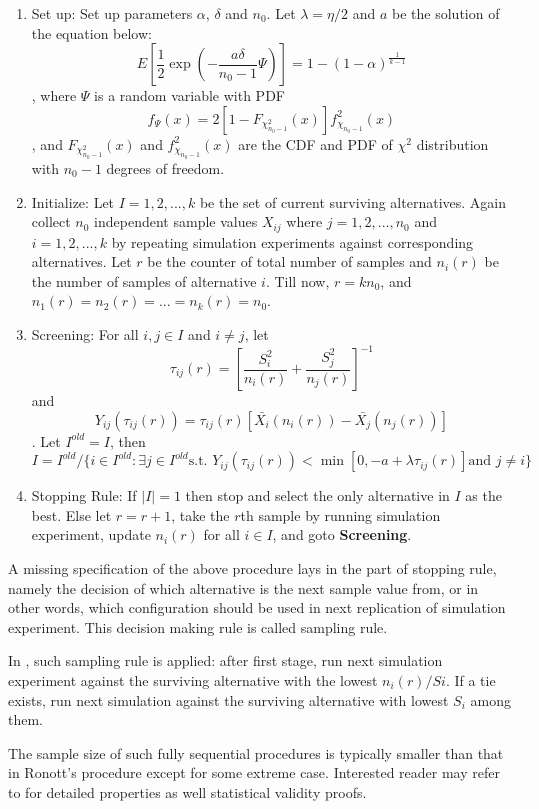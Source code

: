\documentclass[12pt,a4paper]{report}
\begin{document}
\begin{enumerate}
\item{Set up: } Set up parameters $\alpha$, $\delta$ and $n_0$. Let $\lambda = \eta / 2$ and $a$ be the solution of the equation below:
$$ E[\frac{1}{2}\exp(- \frac{a\delta}{n_0 - 1} \Psi)] = 1 - (1 - \alpha)^{\frac{1}{k - 1}} $$,
where $\Psi$ is a random variable with PDF
$$ f_{\Psi}(x) = 2 [1 - F_{\chi_{n_0 - 1}^2}(x)] f_{\chi_{n_0 - 1}}^2(x) $$,
and $F_{\chi_{n_0 - 1}^2}(x)$ and $f_{\chi_{n_0 - 1}}^2(x)$ are the CDF and PDF of $\chi^2$ distribution with $n_0 - 1$ degrees of freedom.
\item{Initialize: } Let $I = {1, 2,...,k}$ be the set of current surviving alternatives. Again collect $n_0$ independent sample values $X_{ij}$ where $j = 1, 2,...,n_0$ and $i = 1, 2,...,k$ by repeating simulation experiments against corresponding alternatives. Let $r$ be the counter of total number of samples and $n_i(r)$ be the number of samples of alternative $i$. Till now, $r = kn_0$, and $n_1(r) = n_2(r) = ... = n_k(r) = n_0$.
\item{Screening: } For all $i,j \in I$ and $i \neq j$, let 
$$ \tau_{ij}(r) = [\frac{S_i^2}{n_i(r)} + \frac{S_j^2}{n_j(r)}]^{-1} $$
and
$$ Y_{ij}(\tau_{ij}(r)) = \tau_{ij}(r)[\bar{X_i}(n_i(r)) - \bar{X_j}(n_j(r))] $$.
Let $I^{old} = I$, then
$$ I = I^{old}/\{i \in I^{old}: \exists j \in I^{old} \text{s.t. } Y_{ij}(\tau_{ij}(r)) < \min[0, - a + \lambda \tau_{ij}(r)]  \text{and } j \neq i\} $$
\item{Stopping Rule: } If $|I| = 1$ then stop and select the only alternative in $I$ as the best. Else let $r = r + 1$, take the $r$th sample by running simulation experiment, update $n_i(r)$ for all $i \in I$, and goto \textbf{Screening}.
\end{enumerate}

A missing specification of the above procedure lays in the part of stopping rule, namely the decision of which alternative is the next sample value from, or in other words, which configuration should be used in next replication of simulation experiment. This decision making rule is called sampling rule.

In \cite{ras-seq-jeff}, such sampling rule is applied: after first stage, run next simulation experiment against the surviving alternative with the lowest $n_i(r)/Si$. If a tie exists, run next simulation against the surviving alternative with lowest $S_i$ among them.

The sample size of such fully sequential procedures is typically smaller than that in Ronott's procedure except for some extreme case. Interested reader may refer to \cite{ras-seq-jeff} for detailed properties as well statistical validity proofs.
\end{document}

